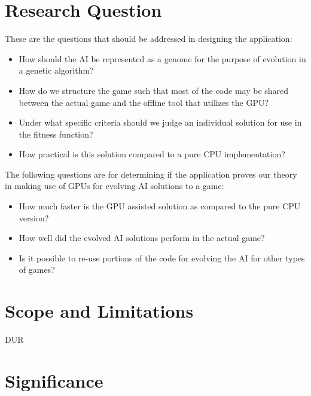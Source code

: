 \section{Research Question}

These are the questions that should be addressed in designing the application:

\begin{itemize}
 \item How should the AI be represented as a genome for the purpose of evolution in a genetic algorithm?

 \item How do we structure the game such that most of the code may be shared between
the actual game and the offline tool that utilizes the GPU?

 \item Under what specific criteria should we judge an individual solution for use in the
fitness function?

 \item How practical is this solution compared to a pure CPU implementation?
\end{itemize}


The following questions are for determining if the application proves our theory
in making use of GPUs for evolving AI solutions to a game:

\begin{itemize}
 \item How much faster is the GPU assisted solution as compared to the pure CPU
 version?
 
 \item How well did the evolved AI solutions perform in the actual game?
 
 \item Is it possible to re-use portions of the code for evolving the AI for other
 types of games?
\end{itemize}

\section{Scope and Limitations}

DUR

\section{Significance}

